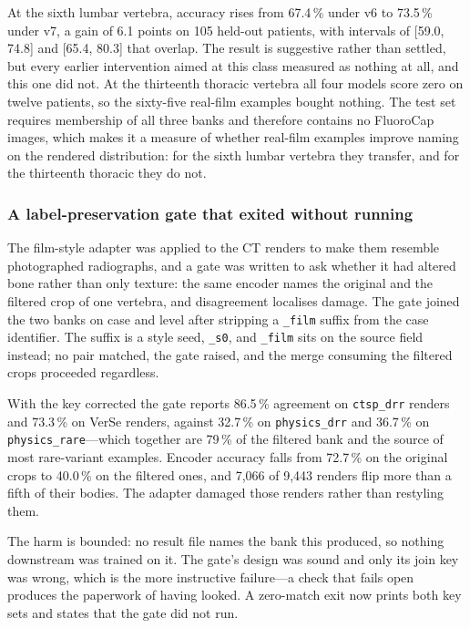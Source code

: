 \documentclass[11pt,letterpaper]{article}
\begin{document}
At the sixth lumbar vertebra, accuracy rises from 67.4\,\% under v6 to 73.5\,\% under v7, a gain of 6.1 points on 105 held-out patients, with intervals of [59.0, 74.8] and [65.4, 80.3] that overlap. The result is suggestive rather than settled, but every earlier intervention aimed at this class measured as nothing at all, and this one did not. At the thirteenth thoracic vertebra all four models score zero on twelve patients, so the sixty-five real-film examples bought nothing. The test set requires membership of all three banks and therefore contains no FluoroCap images, which makes it a measure of whether real-film examples improve naming on the rendered distribution: for the sixth lumbar vertebra they transfer, and for the thirteenth thoracic they do not.

\subsubsection*{A label-preservation gate that exited without running}
The film-style adapter was applied to the CT renders to make them resemble photographed radiographs, and a gate was written to ask whether it had altered bone rather than only texture: the same encoder names the original and the filtered crop of one vertebra, and disagreement localises damage. The gate joined the two banks on case and level after stripping a \texttt{\_film} suffix from the case identifier. The suffix is a style seed, \texttt{\_s0}, and \texttt{\_film} sits on the source field instead; no pair matched, the gate raised, and the merge consuming the filtered crops proceeded regardless.

With the key corrected the gate reports 86.5\,\% agreement on \texttt{ctsp\_drr} renders and 73.3\,\% on VerSe renders, against 32.7\,\% on \texttt{physics\_drr} and 36.7\,\% on \texttt{physics\_rare}---which together are 79\,\% of the filtered bank and the source of most rare-variant examples. Encoder accuracy falls from 72.7\,\% on the original crops to 40.0\,\% on the filtered ones, and 7,066 of 9,443 renders flip more than a fifth of their bodies. The adapter damaged those renders rather than restyling them.

The harm is bounded: no result file names the bank this produced, so nothing downstream was trained on it. The gate's design was sound and only its join key was wrong, which is the more instructive failure---a check that fails open produces the paperwork of having looked. A zero-match exit now prints both key sets and states that the gate did not run.
\end{document}
